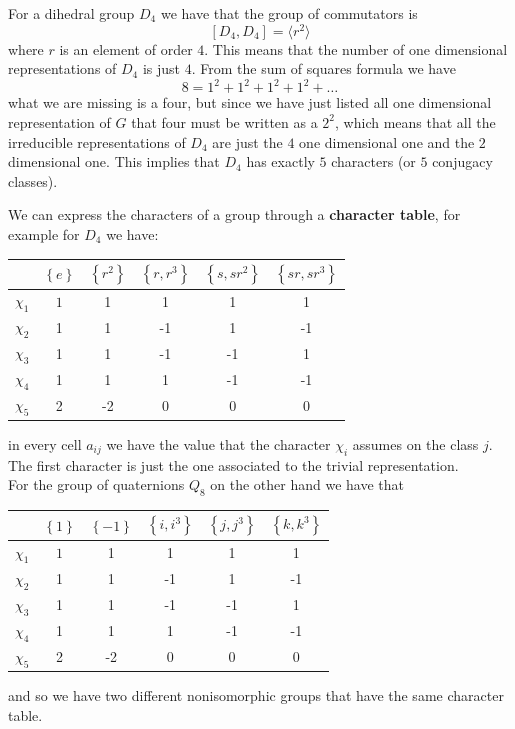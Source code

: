 \documentclass[11pt]{scrartcl}
\begin{document}
	\begin{example}
		For a dihedral group $D_4$ we have that the group of commutators is
		$$[D_4,D_4]=\langle r^2\rangle$$
		where $r$ is an element of order $4$. This means that the number of one dimensional representations of $D_4$ is just $4$. From the sum of squares formula we have 
		$$8=1^2+1^2+1^2+1^2+\dots$$
		what we are missing is a four, but since we have just listed all one dimensional representation of $G$ that four must be written as a $2^2$, which means that all the irreducible representations of $D_4$ are just the $4$ one dimensional one and the $2$ dimensional one. This implies that $D_4$ has exactly $5$ characters (or $5$ conjugacy classes).
	\end{example}
	We can express the characters of a group through a \textbf{character table}, for example for $D_4$ we have:
	\begin{center}
		\begin{tabular}{c|c|c|c|c|c|}
			 &$\left\{e\right\}$ &$\left\{r^2\right\}$&$\left\{r,r^3\right\}$&$\left\{s,sr^2\right\}$&$\left\{sr,sr^3\right\}$ \\
			\hline
			$\chi_1$ & $1$ & 1 &1 & 1 &  1 \\
			\hline
			$\chi_2$ & 1 & 1 & -1 & 1 & -1 \\
			\hline
			$\chi_3$ & 1 & 1 & -1 & -1 & 1 \\
			\hline
			$\chi_4$ & 1 & 1 & 1& -1 &  -1 \\
			\hline
			$\chi_5$ & 2 & -2 & 0 & 0 &  0 \\
		\end{tabular}
	\end{center}
	in every cell $a_{ij}$ we have the value that the character $\chi_i$ assumes on the class $j$. The first character is just the one associated to the trivial representation. \\
	For the group of quaternions $Q_8$ on the other hand we have that
	\begin{center}
		\begin{tabular}{c|c|c|c|c|c|}
			&$\left\{1\right\}$ &$\left\{-1\right\}$&$\left\{i,i^3\right\}$&$\left\{j,j^3\right\}$&$\left\{k,k^3\right\}$ \\
			\hline
			$\chi_1$ & $1$ & 1 &1 & 1 &  1 \\
			\hline
			$\chi_2$ & 1 & 1 & -1 & 1 & -1 \\
			\hline
			$\chi_3$ & 1 & 1 & -1 & -1 & 1 \\
			\hline
			$\chi_4$ & 1 & 1 & 1& -1 &  -1 \\
			\hline
			$\chi_5$ & 2 & -2 & 0 & 0 &  0 \\
		\end{tabular}
	\end{center}
	and so we have two different nonisomorphic groups that have the same character table.
	
\end{document}
